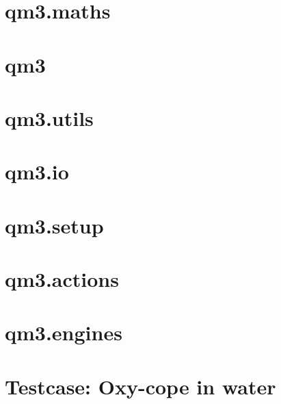 \documentclass[10pt]{article}
\begin{document}
\lhead{} \chead{} \rhead{}
\lfoot{} \cfoot{} \rfoot{\thepage}
\renewcommand{\headrulewidth}{0pt}
\renewcommand{\footrulewidth}{0pt}

\setmainfont{Candara}

\tableofcontents

\newpage

\section{qm3.maths}








\section{qm3}





\section{qm3.utils}







\section{qm3.io}




\section{qm3.setup}


\section{qm3.actions}









\section{qm3.engines}



























\section{Testcase: Oxy-cope in water}



\end{document}
